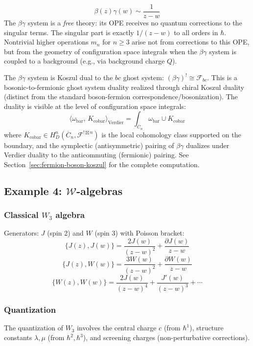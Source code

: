 \[\beta(z)\gamma(w) \sim \frac{1}{z-w}\]
The $\beta\gamma$ system is a \emph{free} theory: its OPE receives no quantum corrections to the singular terms. The singular part is exactly $1/(z-w)$ to all orders in $\hbar$. Nontrivial higher operations $m_n$ for $n \geq 3$ arise not from corrections to this OPE, but from the geometry of configuration space integrals when the $\beta\gamma$ system is coupled to a background (e.g., via background charge $Q$).

The $\beta\gamma$ system is Koszul dual to the $bc$ ghost system: $(\beta\gamma)^! \cong \mathcal{F}_{bc}$. This is a bosonic-to-fermionic ghost system duality realized through chiral Koszul duality (distinct from the standard boson-fermion correspondence/bosonization). The duality is visible at the level of configuration space integrals:
\[\langle \omega_{\text{bar}},\, K_{\text{cobar}} \rangle_{\text{Verdier}} = \int_{\overline{C}_n} \omega_{\text{bar}} \cup K_{\text{cobar}}\]
where $K_{\text{cobar}} \in H^n_{D}(\overline{C}_n, \mathcal{F}^{!\boxtimes n})$ is the local cohomology class supported on the boundary, and the symplectic (antisymmetric) pairing of $\beta\gamma$ dualizes under Verdier duality to the anticommuting (fermionic) pairing. See Section~\ref{sec:fermion-boson-koszul} for the complete computation.

\subsection{Example 4: $\mathcal{W}$-algebras}

\subsubsection{\texorpdfstring{Classical $W_3$ algebra}{Classical W-3 algebra}}

Generators: $J$ (spin 2) and $W$ (spin 3) with Poisson bracket:
\[\{J(z), J(w)\} = \frac{2J(w)}{(z-w)^2} + \frac{\partial J(w)}{z-w}\]
\[\{J(z), W(w)\} = \frac{3W(w)}{(z-w)^2} + \frac{\partial W(w)}{z-w}\]
\[\{W(z), W(w)\} = \frac{2J(w)}{(z-w)^4} + \frac{J'(w)}{(z-w)^3} + \cdots\]

\subsubsection{Quantization}

The quantization of $W_3$ involves the central charge $c$ (from $\hbar^1$), structure constants $\lambda, \mu$ (from $\hbar^2, \hbar^3$), and screening charges (non-perturbative corrections).

